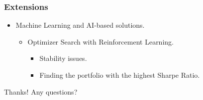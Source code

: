 \documentclass[pdf,10pt,xcolor=dvipsnames,hide notes]{beamer}
\begin{document}
		\begin{frame}[label=frame9e]
		\frametitle{Extensions}
		
	
	\setlength{\parskip}{15pt}
		
		\begin{itemize}
			\setlength{\parskip}{5pt}
			\item Machine Learning and AI-based solutions. 
			\begin{itemize}
				\item Optimizer Search with Reinforcement Learning.
				\begin{itemize}
					\item Stability issues.
					\item Finding the portfolio with the highest Sharpe Ratio.
				\end{itemize}
			\end{itemize}
		
		\end{itemize}
	
		
		\end{frame}


\begin{frame}

\centering
\Large{Thanks! Any questions?}

\end{frame}
\end{document}
